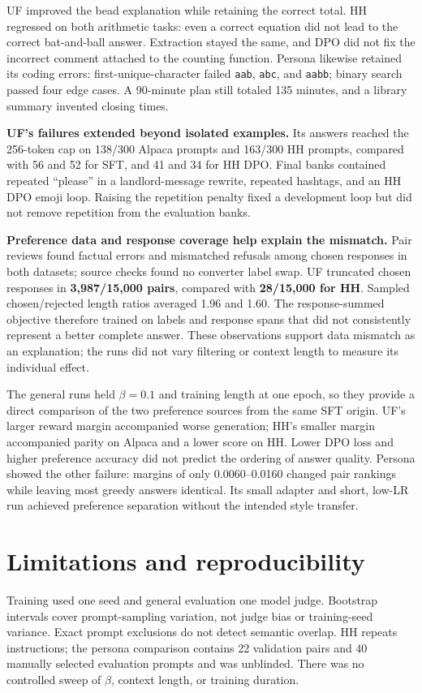 \documentclass[11pt,a4paper]{article}
\begin{document}
UF improved the bead explanation while retaining the correct total. HH regressed on both arithmetic tasks: even a correct equation did not lead to the correct bat-and-ball answer. Extraction stayed the same, and DPO did not fix the incorrect comment attached to the counting function. Persona likewise retained its coding errors: first-unique-character failed \texttt{aab}, \texttt{abc}, and \texttt{aabb}; binary search passed four edge cases. A 90-minute plan still totaled 135 minutes, and a library summary invented closing times.

\textbf{UF's failures extended beyond isolated examples.} Its answers reached the 256-token cap on 138/300 Alpaca prompts and 163/300 HH prompts, compared with 56 and 52 for SFT, and 41 and 34 for HH DPO. Final banks contained repeated ``please'' in a landlord-message rewrite, repeated hashtags, and an HH DPO emoji loop. Raising the repetition penalty fixed a development loop but did not remove repetition from the evaluation banks.

\textbf{Preference data and response coverage help explain the mismatch.} Pair reviews found factual errors and mismatched refusals among chosen responses in both datasets; source checks found no converter label swap. UF truncated chosen responses in \textbf{3,987/15,000 pairs}, compared with \textbf{28/15,000 for HH}. Sampled chosen/rejected length ratios averaged 1.96 and 1.60. The response-summed objective therefore trained on labels and response spans that did not consistently represent a better complete answer. These observations support data mismatch as an explanation; the runs did not vary filtering or context length to measure its individual effect.

The general runs held $\beta=0.1$ and training length at one epoch, so they provide a direct comparison of the two preference sources from the same SFT origin. UF's larger reward margin accompanied worse generation; HH's smaller margin accompanied parity on Alpaca and a lower score on HH. Lower DPO loss and higher preference accuracy did not predict the ordering of answer quality. Persona showed the other failure: margins of only 0.0060--0.0160 changed pair rankings while leaving most greedy answers identical. Its small adapter and short, low-LR run achieved preference separation without the intended style transfer.

\section{Limitations and reproducibility}
Training used one seed and general evaluation one model judge. Bootstrap intervals cover prompt-sampling variation, not judge bias or training-seed variance. Exact prompt exclusions do not detect semantic overlap. HH repeats instructions; the persona comparison contains 22 validation pairs and 40 manually selected evaluation prompts and was unblinded. There was no controlled sweep of $\beta$, context length, or training duration.
\end{document}
